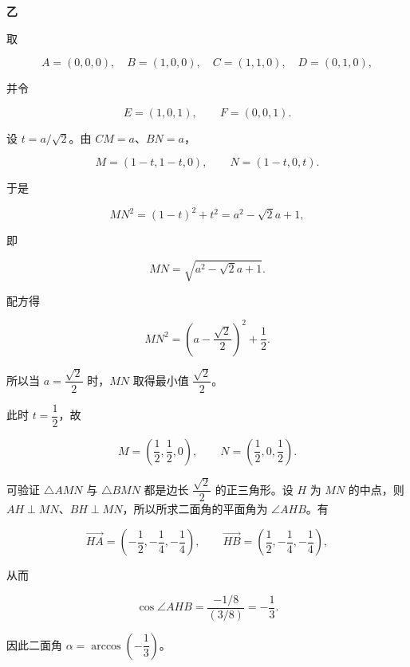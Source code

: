 \begin{answer}
\textbf{乙}


取

\nopagebreak[4]
\[
A=(0,0,0),\quad B=(1,0,0),\quad C=(1,1,0),\quad D=(0,1,0),
\]

并令

\nopagebreak[4]
\[
E=(1,0,1),\qquad F=(0,0,1).
\]

设 $t=a/\sqrt2$。由 $CM=a$、$BN=a$，

\nopagebreak[4]
\[
M=(1-t,1-t,0),\qquad N=(1-t,0,t).
\]

于是

\nopagebreak[4]
\[
MN^2=(1-t)^2+t^2
=a^2-\sqrt2a+1,
\]

即

\nopagebreak[4]
\[
MN=\sqrt{a^2-\sqrt2a+1}.
\]


配方得

\nopagebreak[4]
\[
MN^2=\left(a-\frac{\sqrt2}{2}\right)^2+\frac12.
\]

所以当 $a=\dfrac{\sqrt2}{2}$ 时，$MN$ 取得最小值 $\dfrac{\sqrt2}{2}$。


此时 $t=\dfrac12$，故

\nopagebreak[4]
\[
M=\left(\frac12,\frac12,0\right),\qquad
N=\left(\frac12,0,\frac12\right).
\]

可验证 $\triangle AMN$ 与 $\triangle BMN$ 都是边长 $\dfrac{\sqrt2}{2}$ 的正三角形。设 $H$ 为 $MN$ 的中点，则 $AH\perp MN$、$BH\perp MN$，所以所求二面角的平面角为 $\angle AHB$。有

\nopagebreak[4]
\[
\overrightarrow{HA}=\left(-\frac12,-\frac14,-\frac14\right),\qquad
\overrightarrow{HB}=\left(\frac12,-\frac14,-\frac14\right),
\]

从而

\nopagebreak[4]
\[
\cos\angle AHB
=\frac{-1/8}{(3/8)}
=-\frac13.
\]

因此二面角 $\alpha=\arccos\left(-\dfrac13\right)$。




\end{answer}
